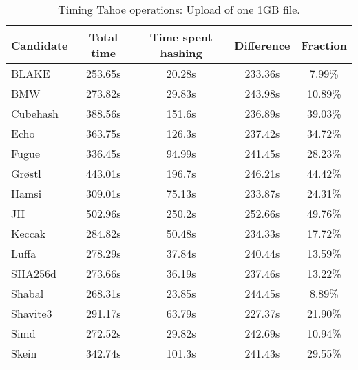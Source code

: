 \begin{table}[h]
  \centering
  \begin{tabular}{ | l | c | c | c | c | }
    \hline
    Candidate & Total time & Time spent hashing & Difference & Fraction \\ \hline
    BLAKE     &  253.65s  &  20.28s  &  233.36s  &  7.99\%   \\  \hline
    BMW       &  273.82s  &  29.83s  &  243.98s  &  10.89\%  \\  \hline
    Cubehash  &  388.56s  &  151.6s  &  236.89s  &  39.03\%  \\  \hline
    Echo      &  363.75s  &  126.3s  &  237.42s  &  34.72\%  \\  \hline
    Fugue     &  336.45s  &  94.99s  &  241.45s  &  28.23\%  \\  \hline
    Grøstl    &  443.01s  &  196.7s  &  246.21s  &  44.42\%  \\  \hline
    Hamsi     &  309.01s  &  75.13s  &  233.87s  &  24.31\%  \\  \hline
    JH        &  502.96s  &  250.2s  &  252.66s  &  49.76\%  \\  \hline
    Keccak    &  284.82s  &  50.48s  &  234.33s  &  17.72\%  \\  \hline
    Luffa     &  278.29s  &  37.84s  &  240.44s  &  13.59\%  \\  \hline
    SHA256d   &  273.66s  &  36.19s  &  237.46s  &  13.22\%  \\  \hline
    Shabal    &  268.31s  &  23.85s  &  244.45s  &  8.89\%   \\  \hline
    Shavite3  &  291.17s  &  63.79s  &  227.37s  &  21.90\%  \\  \hline
    Simd      &  272.52s  &  29.82s  &  242.69s  &  10.94\%  \\  \hline
    Skein     &  342.74s  &  101.3s  &  241.43s  &  29.55\%  \\  \hline
  \end{tabular}
  \caption{Timing Tahoe operations: Upload of one 1GB file.}
  \label{tbl:hashingtimes:put1gb}
\end{table}

